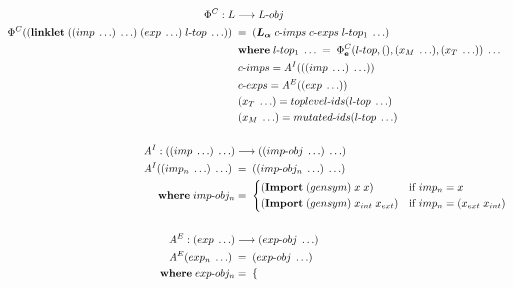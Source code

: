 \documentclass[sigplan,screen,anonymous]{acmart}
\def\dash {\text{-}}
\begin{document}






\begin{figure*}[tbp]
  \small
  \begin{align*}
    \Phi^C : L &\longrightarrow L\dash obj \\
    \Phi^C((\textbf{linklet}\; ((imp\; \ldots)\; \ldots)\; (exp\; \ldots)\; l\dash top\; \ldots))\; &=\; (\la\; c\dash imps\; c\dash exps\; l\dash top_1\; \ldots) \\
    \;        &\; \where l\dash top_1\; \ldots\; =\; \Phi^C_{\textbf{e}}(l\dash top,(),(x_M\;\ldots),(x_T\;\ldots))\; \ldots \\
    \;        &\; c\dash imps = \mathit{A}^I(((imp\; \ldots)\; \ldots)) \\
    \;        &\; c\dash exps = \mathit{A}^E((exp\; \ldots)) \\
    \;        &\; (x_T\;\ldots) = toplevel\dash ids(l\dash top\; \ldots) \\
    \;        &\; (x_M\;\ldots) = mutated\dash ids(l\dash top\; \ldots) \\ \\
    \mathit{A}^I : ((imp\; \ldots)\; \ldots) &\longrightarrow ((imp\dash obj\; \ldots)\; \ldots) \\
    \mathit{A}^I((imp_n\; \ldots)\; \ldots)\; &=\; ((imp\dash obj_n\; \ldots)\; \ldots) \\
    \;   \where imp\dash obj_n  &=\; \begin{cases*}
      (\textbf{Import}\;(gensym)\;x\;x) & if $imp_n = x$ \\
      (\textbf{Import}\;(gensym)\;x_{int}\;x_{ext}) & if $imp_n = (x_{ext}\;x_{int})$ \\
    \end{cases*} \\ \\
    \mathit{A}^E : (exp\; \ldots) &\longrightarrow (exp\dash obj\; \ldots) \\
    \mathit{A}^E(exp_n\; \ldots)\; &=\; (exp\dash obj\; \ldots) \\
    \;   \where exp\dash obj_n  &=\; \begin{cases*}

\end{cases*}
\end{align*}
\end{figure*}
\end{document}
